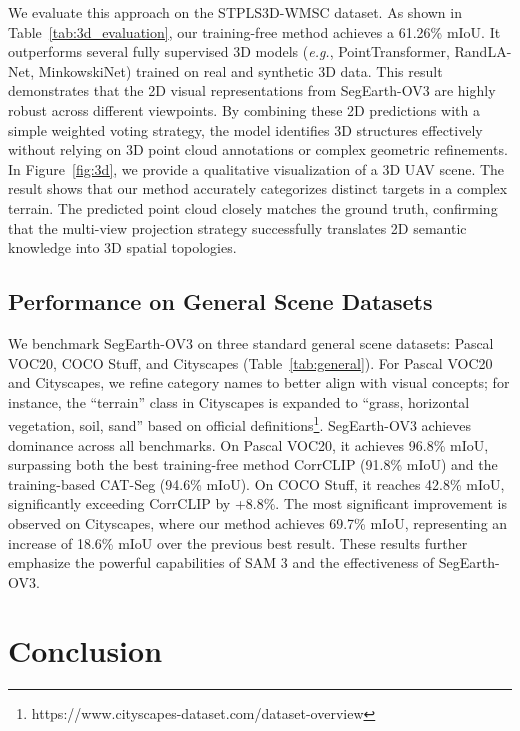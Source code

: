 \documentclass[twocolumn,switch,times]{article}
\newcommand{\samov}{SegEarth-OV\textcolor{cvprpink}{3}\xspace}
\begin{document}
We evaluate this approach on the STPLS3D-WMSC dataset. As shown in Table~\ref{tab:3d_evaluation}, our training-free method achieves a 61.26\% mIoU. It outperforms several fully supervised 3D models (\textit{e.g.}, PointTransformer, RandLA-Net, MinkowskiNet) trained on real and synthetic 3D data. This result demonstrates that the 2D visual representations from \samov are highly robust across different viewpoints. By combining these 2D predictions with a simple weighted voting strategy, the model identifies 3D structures effectively without relying on 3D point cloud annotations or complex geometric refinements.
In Figure~\ref{fig:3d}, we provide a qualitative visualization of a 3D UAV scene. The result shows that our method accurately categorizes distinct targets in a complex terrain. The predicted point cloud closely matches the ground truth, confirming that the multi-view projection strategy successfully translates 2D semantic knowledge into 3D spatial topologies.


\subsection{Performance on General Scene Datasets}

We benchmark \samov on three standard general scene datasets: Pascal VOC20, COCO Stuff, and Cityscapes (Table~\ref{tab:general}). For Pascal VOC20 and Cityscapes, we refine category names to better align with visual concepts; for instance, the ``terrain'' class in Cityscapes is expanded to ``grass, horizontal vegetation, soil, sand'' based on official definitions\footnote{https://www.cityscapes-dataset.com/dataset-overview}. \samov achieves dominance across all benchmarks. On Pascal VOC20, it achieves 96.8\% mIoU, surpassing both the best training-free method CorrCLIP (91.8\% mIoU) and the training-based CAT-Seg (94.6\% mIoU). On COCO Stuff, it reaches 42.8\% mIoU, significantly exceeding CorrCLIP by +8.8\%. The most significant improvement is observed on Cityscapes, where our method achieves 69.7\% mIoU, representing an increase of 18.6\% mIoU over the previous best result. These results further emphasize the powerful capabilities of SAM 3 and the effectiveness of \samov.



\section{Conclusion}
\end{document}
